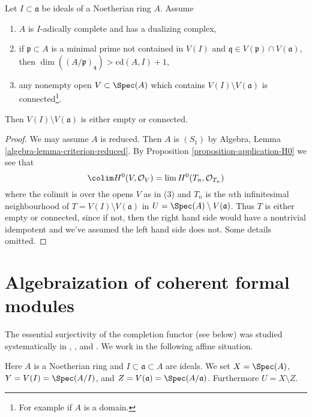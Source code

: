 \begin{lemma}
\label{lemma-connected}
Let $I \subset \mathfrak a$ be ideals of a Noetherian ring $A$.
Assume
\begin{enumerate}
\item $A$ is $I$-adically complete and has a dualizing complex,
\item if $\mathfrak p \subset A$ is a minimal prime not contained
in $V(I)$ and $\mathfrak q \in V(\mathfrak p) \cap V(\mathfrak a)$, then
$\dim((A/\mathfrak p)_\mathfrak q) > \text{cd}(A, I) + 1$,
\item any nonempty open $V \subset \Spec(A)$ which contains
$V(I) \setminus V(\mathfrak a)$ is connected\footnote{For example
if $A$ is a domain.}.
\end{enumerate}
Then $V(I) \setminus V(\mathfrak a)$ is either empty or connected.
\end{lemma}

\begin{proof}
We may assume $A$ is reduced. Then $A$ is $(S_1)$ by
Algebra, Lemma \ref{algebra-lemma-criterion-reduced}.
By Proposition \ref{proposition-application-H0} we see that
$$
\colim H^0(V, \mathcal{O}_V) = \lim H^0(T_n, \mathcal{O}_{T_n})
$$
where the colimit is over the opens $V$ as in (3) and
$T_n$ is the $n$th infinitesimal neighbourhood of
$T = V(I) \setminus V(\mathfrak a)$ in $U = \Spec(A) \setminus V(\mathfrak a)$.
Thus $T$ is either empty or connected, since if not, then the right hand side
would have a nontrivial idempotent and we've assumed the left hand
side does not. Some details omitted.
\end{proof}




\section{Algebraization of coherent formal modules}
\label{section-algebraization-modules}

\noindent
The essential surjectivity of the completion functor (see below)
was studied systematically in
\cite{SGA2}, \cite{MRaynaud-book}, and \cite{MRaynaud-paper}.
We work in the following affine situation.

\begin{situation}
\label{situation-algebraize}
Here $A$ is a Noetherian ring and $I \subset \mathfrak a \subset A$ are ideals.
We set $X = \Spec(A)$, $Y = V(I) = \Spec(A/I)$, and
$Z = V(\mathfrak a) = \Spec(A/\mathfrak a)$. Furthermore $U = X \setminus Z$.
\end{situation}

